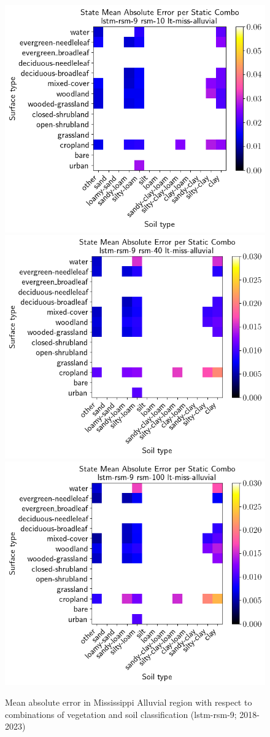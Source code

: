\begin{figure}[H]
    \centering

    \includegraphics[width=.32\linewidth,draft=false]{figures/lt-miss-alluvial/eval-grid_lt-miss-alluvial_lstm-rsm-9_rsm-10_static-combos_abs-err_state.png}
    \includegraphics[width=.32\linewidth,draft=false]{figures/lt-miss-alluvial/eval-grid_lt-miss-alluvial_lstm-rsm-9_rsm-40_static-combos_abs-err_state.png}
    \includegraphics[width=.32\linewidth,draft=false]{figures/lt-miss-alluvial/eval-grid_lt-miss-alluvial_lstm-rsm-9_rsm-100_static-combos_abs-err_state.png}

    \caption{Mean absolute error in Mississippi Alluvial region with respect to combinations of vegetation and soil classification (lstm-rsm-9; 2018-2023)}
    \label{lt_static-combos_miss-alluvial}
\end{figure}


